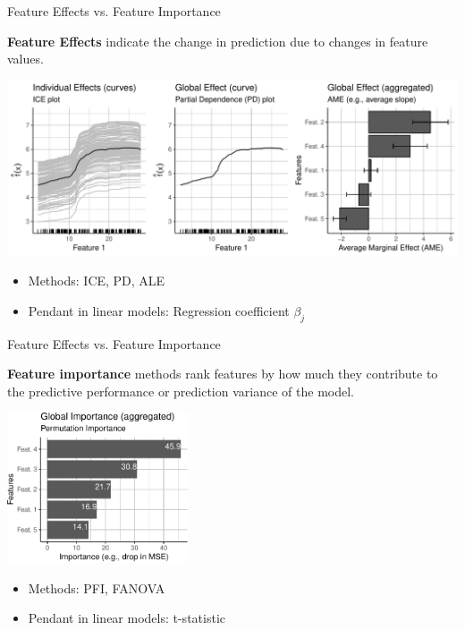\documentclass[11pt,compress,t,notes=noshow, xcolor=table]{beamer}
\begin{document}
\begin{vbframe}{Feature Effects vs. Feature Importance}
	
	\textbf{Feature Effects} indicate the change in prediction due to changes in feature values.
	\medskip
	\begin{center}
		\includegraphics[page=1, width=\textwidth]{figure/feature-effects}
	\end{center}
	\begin{itemize}
		\item Methods: ICE, PD, ALE
		\item Pendant in linear models: Regression coefficient $\beta_j$
	\end{itemize}
\end{vbframe}

\begin{vbframe}{Feature Effects vs. Feature Importance}
	
	\textbf{Feature importance} methods rank features by how much they contribute to the predictive performance or prediction variance of the model.
	\begin{center}
		\includegraphics[page=1, width=0.4\textwidth]{figure/feature-importance}
	\end{center}
	\begin{itemize}
		\itemsep1em
		\item Methods: PFI, FANOVA
		\item Pendant in linear models: t-statistic
	\end{itemize}

\end{vbframe}
\end{document}
